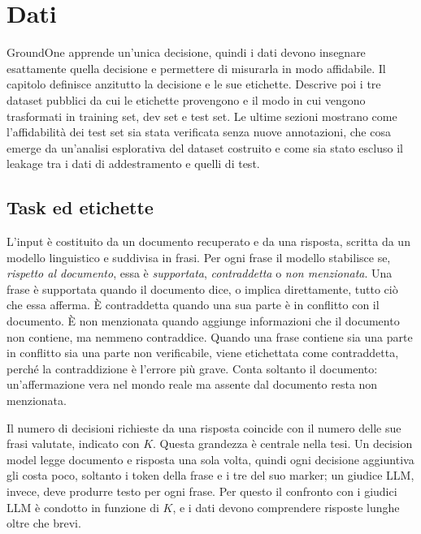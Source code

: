 \chapter{Dati}
\label{ch:data}

GroundOne apprende un'unica decisione, quindi i dati devono insegnare esattamente quella decisione e permettere di
misurarla in modo affidabile. Il capitolo definisce anzitutto la decisione e le sue etichette. Descrive poi i tre
dataset pubblici da cui le etichette provengono e il modo in cui vengono trasformati in training set, dev set e test
set. Le ultime sezioni mostrano come l'affidabilità dei test set sia stata verificata senza nuove annotazioni, che cosa
emerge da un'analisi esplorativa del dataset costruito e come sia stato escluso il leakage tra i dati di addestramento e
quelli di test.


\section{Task ed etichette}
\label{sec:data-task}

L'input è costituito da un documento recuperato e da una risposta, scritta da un modello linguistico e suddivisa in
frasi. Per ogni frase il modello stabilisce se, \emph{rispetto al documento}, essa è \emph{supportata},
\emph{contraddetta} o \emph{non menzionata}. Una frase è supportata quando il documento dice, o implica direttamente,
tutto ciò che essa afferma. È contraddetta quando una sua parte è in conflitto con il documento. È non menzionata quando
aggiunge informazioni che il documento non contiene, ma nemmeno contraddice. Quando una frase contiene sia una parte in
conflitto sia una parte non verificabile, viene etichettata come contraddetta, perché la contraddizione è l'errore più
grave. Conta soltanto il documento: un'affermazione vera nel mondo reale ma assente dal documento resta non menzionata.

Il numero di decisioni richieste da una risposta coincide con il numero delle sue frasi valutate, indicato con $K$.
Questa grandezza è centrale nella tesi. Un decision model legge documento e risposta una sola volta, quindi ogni decisione aggiuntiva gli costa poco, soltanto i token della frase e i tre del suo marker; un giudice LLM, invece, deve produrre testo per ogni frase. Per questo il
confronto con i giudici LLM è condotto in funzione di $K$, e i dati devono comprendere risposte lunghe oltre che
brevi.

